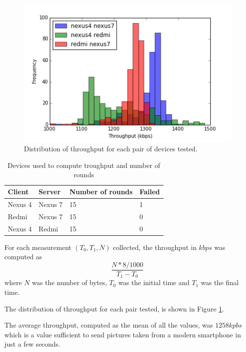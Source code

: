 \begin{figure}[h]
  \centering
  \includegraphics[width=1.0\textwidth]{application/img/tr-distribution.png}
  \caption{Distribution of throughput for each pair of devices tested.}
  \label{figure:tr-distribution}
\end{figure}

\begin{table}[ht]
\centering
\begin{tabular}{llll}
\hline
Client        & Server      & Number of rounds &  Failed  \\ \hline
Nexus 4       & Nexus 7     & 15               & 1        \\
Redmi         & Nexus 7     & 15               & 0        \\
Nexus 4       & Redmi       & 15               & 0        \\
\hline
\end{tabular}
\caption{Devices used to compute troughput and number of rounds}
\label{table:tr-measurements}
\end{table}

For each measurement $(T_0, T_1, N)$ collected, the throughput in $kbps$ was computed as 
\[\frac{N*8/1000}{T_1 - T_0}\]
where $N$ was the number of bytes, $T_0$ was the initial time and $T_1$ was the final time.

The distribution of throughput for each pair tested, is shown in Figure \ref{figure:tr-distribution}.

The average throughput, computed as the mean of all the values, was $1258 kpbs$ which is a value sufficient to send pictures taken from a modern smartphone in just a few seconds.

